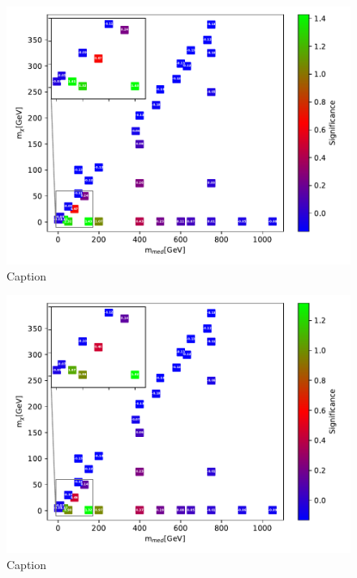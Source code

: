 \begin{figure}
    \centering
    \includegraphics[width = \textwidth]{Figures/Significances/significance_BDT_monoZ_High_level.pdf}
    \caption{Caption}
    \label{fig:my_label}
\end{figure}



\begin{figure}
    \centering
    \includegraphics[width = \textwidth]{Figures/Significances/significance_NN_monoZ_All_level.pdf}
    \caption{Caption}
    \label{fig:my_label}
\end{figure}

